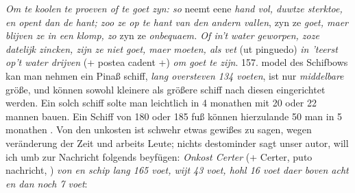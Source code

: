 \pstart \textit{Om te }\textit{koolen}\protect{}\textit{ te proeven of te goet zyn: so} neemt eene \textit{hand vol, duwtze sterktoe, en opent dan de hant; zoo ze op te hant van den andern vallen}, zyn ze \textit{goet, maer blijven ze in een klomp, zo} zyn ze \textit{onbequaem. Of in't water geworpen, zoze datelijk zincken, zijn ze niet goet, maer moeten, als vet} (ut pinguedo) \textit{in 'teerst op't water drijven} (+ postea cadent +) \textit{om goet te zijn}.
\pend 
\clearpage 
\pstart {}\protect{} 157.  model des Schifbows\protect{} kan man nehmen ein Pinaß schiff\protect{}, \textit{lang oversteven 134 voeten}, ist nur \textit{middelbare} gr\"{o}ße, und k\"{o}nnen sowohl kleinere als gr\"{o}ßere schiff\protect{} nach diesen eingerichtet werden. Ein solch schiff\protect{} solte man leichtlich in 4 monathen mit 20 oder 22 mannen bauen. Ein Schiff\protect{} von 180 oder 185 fuß k\"{o}nnen hierzulande 50 man in 5 monathen . Von den unkosten ist schwehr etwas gewißes zu sagen, wegen ver\"{a}nderung der Zeit und arbeits Leute; nichts destominder sagt unser autor, will ich umb zur Nachricht folgends beyf\"{u}gen: \textit{Onkost Certer} (+ Certer, puto nachricht, ) \textit{von en schip\protect{} lang 165 voet, wijt 43 voet, hohl 16 voet daer boven acht en dan noch 7 voet}:
\setlength\LTleft{0pt} \setlength\LTright{0pt} \setcounter{LTchunksize}{90}
